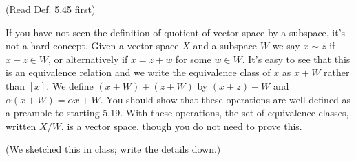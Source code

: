 \documentclass[minion]{homework}
\begin{document}
\begin{aproblems}



 (Read Def. 5.45 first)




If you have not seen the definition of quotient of vector space by a subspace, it's not a hard concept.  Given a vector space $X$ and a subspace $W$ we say
$x\sim z$ if $x-z\in W$, or alternatively if $x=z+w$ for some $w\in W$.  It's
easy to see that this is an equivalence relation and we write the equivalence
class of $x$ as $x+W$ rather than $[x]$.  We define $(x+W)+(z+W)$ by $(x+z)+W$
and $\alpha(x+W)=\alpha x+ W$.  You should show that these operations are well defined as a preamble to starting 5.19.  With these operations, the set of equivalence classes, written $X/W$, is a vector space, though you do not need to prove this.

 (We sketched this in class; write the details down.)

\end{aproblems}
\end{document}
